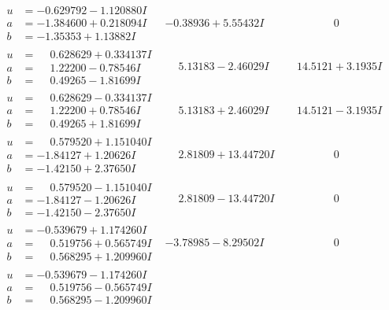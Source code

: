 \documentclass[1p]{elsarticle_modified}
\theoremstyle{definition}
\begin{document}
$$\begin{array}{c|c|c}
\begin{aligned}
u &= -0.629792 - 1.120880 I \\
a &= -1.384600 + 0.218094 I \\
b &= -1.35353 + 1.13882 I\end{aligned}
 & -0.38936 + 5.55432 I & \phantom{-0.000000 } 0 \\ \hline\begin{aligned}
u &= \phantom{-}0.628629 + 0.334137 I \\
a &= \phantom{-}1.22200 - 0.78546 I \\
b &= \phantom{-}0.49265 - 1.81699 I\end{aligned}
 & \phantom{-}5.13183 - 2.46029 I & \phantom{-}14.5121 + 3.1935 I \\ \hline\begin{aligned}
u &= \phantom{-}0.628629 - 0.334137 I \\
a &= \phantom{-}1.22200 + 0.78546 I \\
b &= \phantom{-}0.49265 + 1.81699 I\end{aligned}
 & \phantom{-}5.13183 + 2.46029 I & \phantom{-}14.5121 - 3.1935 I \\ \hline\begin{aligned}
u &= \phantom{-}0.579520 + 1.151040 I \\
a &= -1.84127 + 1.20626 I \\
b &= -1.42150 + 2.37650 I\end{aligned}
 & \phantom{-}2.81809 + 13.44720 I & \phantom{-0.000000 } 0 \\ \hline\begin{aligned}
u &= \phantom{-}0.579520 - 1.151040 I \\
a &= -1.84127 - 1.20626 I \\
b &= -1.42150 - 2.37650 I\end{aligned}
 & \phantom{-}2.81809 - 13.44720 I & \phantom{-0.000000 } 0 \\ \hline\begin{aligned}
u &= -0.539679 + 1.174260 I \\
a &= \phantom{-}0.519756 + 0.565749 I \\
b &= \phantom{-}0.568295 + 1.209960 I\end{aligned}
 & -3.78985 - 8.29502 I & \phantom{-0.000000 } 0 \\ \hline\begin{aligned}
u &= -0.539679 - 1.174260 I \\
a &= \phantom{-}0.519756 - 0.565749 I \\
b &= \phantom{-}0.568295 - 1.209960 I\end{aligned}

\end{array}$$
\end{document}
